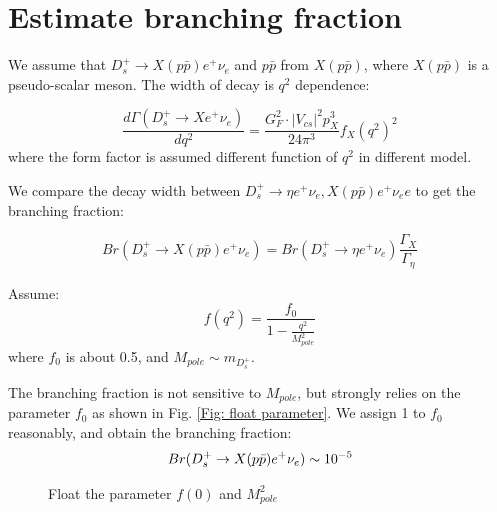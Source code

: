 \section{Estimate branching fraction}
We assume that $D_{s}^{+} \rightarrow X(p\bar{p}) e^{+} \nu_{e}$ and $p
\bar{p}$ from $X(p\bar{p})$, where $X(p\bar{p})$ is a pseudo-scalar meson. The
width of decay is $q^{2}$ dependence: 

\begin{equation}
    \frac{d \Gamma (D_{s}^{+} \rightarrow X e^{+} \nu _{e} )}{d q^{2}}
    = \frac{G^{2}_{F} \cdot | V_{cs} |^{2} p_{X} ^{3} }{24 \pi ^{3}} f
    _{X} (q^{2})^{2} 
\end{equation}
where the form factor is assumed different function of $q^{2}$ in
different model. 

We compare the decay width between $D_{s}^{+} \rightarrow \eta e^{+}
\nu_{e}, X(p\bar{p}) e^{+} \nu_e{e}$ to get the branching fraction:
    
\begin{equation}
    Br(D_{s}^{+} \rightarrow X(p\bar{p}) e^{+} \nu_{e}) = Br(D_{s}^{+}
    \rightarrow \eta e^{+} \nu_{e}) \frac{\Gamma_{X}}{\Gamma_{\eta}}
\end{equation}

Assume\cite{Bauer:1988fx}: 
\begin{equation}
    f(q^{2}) = \frac{f_{0}}{1-\frac{q^{2}}{M_{pole}^{2}}}
\end{equation}
where $f_{0}$ is about 0.5, and $M_{pole} \sim m_{D_{s}^{+}}$.

The branching fraction is not sensitive to $M_{pole}$, but strongly
relies on the parameter $f_{0}$ as shown in Fig. \ref{Fig: float
parameter}. We assign 1 to $f_{0}$ reasonably, and obtain the branching
fraction: 
\begin{equation}
Br(D_{s}^{+} \rightarrow X(p\bar{p}) e^{+} \nu_{e}) \sim
10^{-5}  \notag
\end{equation}
\begin{figure}[htbp]
    \caption{Float the parameter $f(0)$ and $M_{pole}^{2}$ }
    \label{Fig: float parameter}
\end{figure}
    
